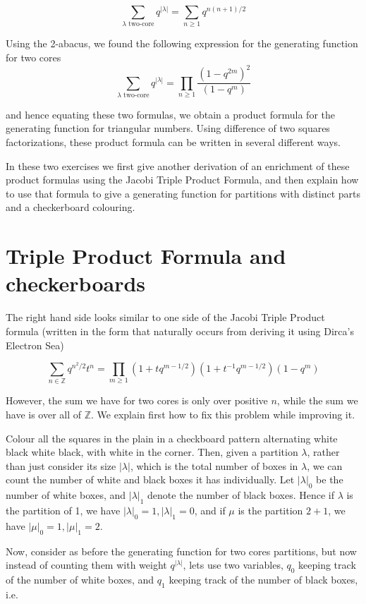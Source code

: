 \documentclass{article}
\theoremstyle{definition}
\begin{document}
$$\sum_{\lambda \textrm{ two-core}}q^{|\lambda|}= \sum_{n\geq 1} q^{n(n+1)/2}$$

Using the 2-abacus, we found the following expression for the generating function for two cores
$$\sum_{\lambda \textrm{ two-core}}q^{|\lambda|}=\prod_{n\geq 1} \frac{(1-q^{2m})^2}{(1-q^m)}$$

and hence equating these two formulas, we obtain a product formula for the generating function for triangular numbers.  Using difference of two squares factorizations, these product formula can be written in several different ways.

In these two exercises we first give another derivation of an enrichment of these product formulas using the Jacobi Triple Product Formula, and then explain how to use that formula to give a generating function for partitions with distinct parts and a checkerboard colouring.


\section{Triple Product Formula and checkerboards}

The right hand side looks similar to one side of the Jacobi Triple Product formula (written in the form that naturally occurs from deriving it using Dirca's Electron Sea)

$$\sum_{n\in\mathbb{Z}} q^{n^2/2}t^n=\prod_{m\geq 1}(1+tq^{m-1/2})(1+t^{-1}q^{m-1/2})(1-q^m)$$

However, the sum we have for two cores is only over positive $n$, while the sum we have is over all of $\mathbb{Z}$.  We explain first how to fix this problem while improving it.

Colour all the squares in the plain in a checkboard pattern alternating white black white black, with white in the corner.  Then, given a partition $\lambda$, rather than just consider its size $|\lambda|$, which is the total number of boxes in $\lambda$, we can count the number of white and black boxes it has individually.  Let $|\lambda|_0$ be the number of white boxes, and $|\lambda|_1$ denote the number of black boxes.  Hence if $\lambda$ is the partition of 1, we have $|\lambda|_0=1, |\lambda|_1=0$, and if $\mu$ is the partition $2+1$, we have $|\mu|_0=1, |\mu|_1=2$.

Now, consider as before the generating function for two cores partitions, but now instead of counting them with weight $q^{|\lambda|}$, lets use two variables, $q_0$ keeping track of the number of white boxes, and $q_1$ keeping track of the number of black boxes, i.e.
\end{document}
